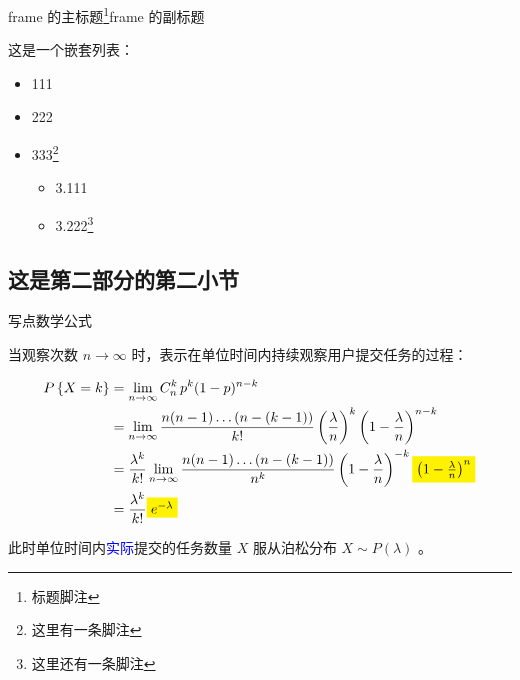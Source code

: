 \documentclass[aspectratio=169]{beamer}
\begin{document}
\begin{frame}{frame 的主标题\footnote{标题脚注}}{frame 的副标题}

  这是一个嵌套列表：

  \begin{itemize}
    \item 111
    \item 222
    \item 333\footnote{这里有一条脚注}
      \begin{itemize}
        \item 3.111
        \item 3.222\footnote{这里还有一条脚注}
      \end{itemize}
  \end{itemize}

\end{frame}

\subsection{这是第二部分的第二小节}

\begin{frame}{写点数学公式}

  当观察次数 $n \rightarrow \infty$ 时，表示在单位时间内持续观察用户提交任务的过程：

  \begin{equation*}
    \begin{split}
      P\left\{X=k\right\} & = \lim_{n \rightarrow \infty} C_n^k \, p^k (1-p)^{n-k}                                                                                                                              \\
      & = \lim_{n \rightarrow \infty} \frac{n(n-1)\dots(n-(k-1))}{k!} \left(\frac{\lambda}{n}\right)^k \left(1-\frac{\lambda}{n}\right)^{n-k}                                               \\
      & = \frac{\lambda^k}{k!} \lim_{n \rightarrow \infty} \frac{n(n-1)\dots(n-(k-1))}{n^k} \left(1-\frac{\lambda}{n}\right)^{-k} \colorbox{yellow}{$\left(1-\frac{\lambda}{n}\right)^{n}$} \\
      & = \frac{\lambda^k}{k!} \colorbox{yellow}{$e^{-\lambda}$}
    \end{split}
  \end{equation*}

  此时单位时间内\textcolor{blue}{实际}提交的任务数量 $X$ 服从泊松分布 $X \sim P(\lambda)$ 。

\end{frame}
\end{document}
